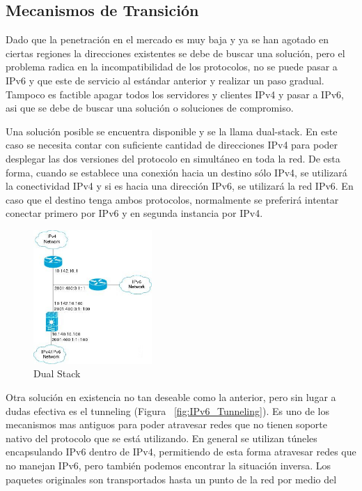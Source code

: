 \documentclass[11pt,a4paper]{article}
\begin{document}
\subsection{Mecanismos de Transición}
Dado que la penetración en el mercado es muy baja y ya se han agotado en ciertas regiones la 
direcciones existentes se debe de buscar una solución, pero el problema radica en la 
incompatibilidad de los protocolos, no se puede pasar a IPv6 y que este de servicio al estándar 
anterior y realizar un paso gradual. Tampoco es factible apagar todos los servidores y clientes IPv4 
y pasar a IPv6, asi que se debe de buscar una solución o soluciones de compromiso.\par
Una solución posible se encuentra disponible y se la llama dual-stack.
En este caso se necesita contar con suficiente cantidad de direcciones IPv4 para poder desplegar las 
dos versiones del protocolo en simultáneo en toda la red. De esta forma, cuando se establece una 
conexión hacia un destino sólo IPv4, se utilizará la conectividad IPv4 y si es hacia una dirección 
IPv6, se utilizará la red IPv6. En caso que el destino tenga ambos protocolos, normalmente se 
preferirá intentar conectar primero por IPv6 y en segunda instancia por IPv4.
\begin{figure}[h!]
 \centering
 \includegraphics[width=0.4\textwidth]{dual_stack.jpg}
 \caption[Dual Stack]{Dual Stack}
\end{figure}\par
Otra solución en existencia no tan deseable como la anterior, pero sin lugar a dudas efectiva es el 
tunneling (Figura ~\ref{fig:IPv6_Tunneling}).
Es uno de los mecanismos mas antiguos para poder atravesar redes que no tienen soporte nativo del 
protocolo que se está utilizando. En general se utilizan túneles encapsulando IPv6 dentro de IPv4, 
permitiendo de esta forma atravesar redes que no manejan IPv6, pero también podemos encontrar la 
situación inversa. Los paquetes originales son transportados hasta un punto de la red por medio del 
\end{document}
